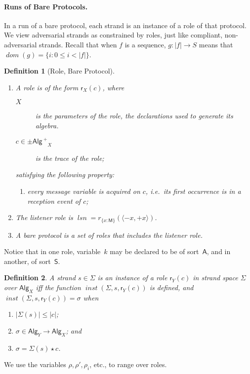 \documentclass[12pt]{article}
\newcommand{\fn}[1]{\ensuremath{\operatorname{\mathit{#1}}}}
\newcommand{\sdom}{\fn{dom}}
\newcommand{\seq}[1]{\ensuremath{\langle#1\rangle}}
\newcommand{\inbnd}{\mathord -}
\newcommand{\outbnd}{\mathord +}
\newcommand{\srt}[1]{\ensuremath{\mathsf{#1}}}
\newcommand{\inst}{\star}
\newcommand{\tr}{\ensuremath{{\pm\msg\,}^+}}
\newcommand{\length}[1]{\ensuremath{|#1|}}
\newcommand{\role}{\mathsf{r}}
\newcommand{\alg}[1]{\ensuremath{\mathsf{#1}}}
\newcommand{\msg}{\alg{Alg}}
\newcommand{\ssp}{\Sigma}
\newcommand{\nonatomic}{{message}}
\newtheorem{definition}{Definition}
\begin{document}
\paragraph{Runs of Bare Protocols.}
%
In a run of a bare protocol, each strand is an instance of a role of
that protocol.  We view adversarial strands as constrained by roles,
just like compliant, non-adversarial strands.  Recall that when $f$ is
a sequence, $g\colon\length{f}\rightarrow S$ means that
$\sdom(g)=\{i\colon0\le i<\length{f}\}$.
%
\begin{definition}[Role, Bare Protocol]\label{def:role bare protocol}
  ~
  \begin{enumerate}
    \item A \emph{role} is of the form $\role_X(c)$, where
    \begin{description}
      \item[$X$] is the \emph{parameters} of the role, the
        declarations used to generate its algebra.
      \item[$c\in\tr_X$] is the trace of the role;
    \end{description}
%
    satisfying the following property:
%
%
    \begin{enumerate}
      \item every {\nonatomic} variable is acquired on $c$, i.e.~its
      first occurrence is in a reception event of $c$;
    \end{enumerate}
    \item The \emph{listener role} is
      $\fn{lsn}=r_{\{x:\srt{M}\}}(\seq{\inbnd x, \outbnd x})$.
    \item A \emph{bare protocol} is a set of roles that includes the
      listener role.
  \end{enumerate}
\end{definition}
%
Notice that in one role, variable~$k$ may be declared to be of
sort~\srt{A}, and in another, of sort~\srt{S}.
%
\begin{definition}\label{def:instance}
  A strand $s\in\ssp$ is an \emph{instance} of a role $\role_Y(c)$ in
  strand space $\ssp$ over $\msg_X$ iff the function
  $\fn{inst}(\ssp,s,\role_Y(c))$ is defined, and
  $\fn{inst}(\ssp,s,\role_Y(c)) = \sigma$ when
  \begin{enumerate}
    \item $\length{\ssp(s)}\leq\length{c}$;
    \item $\sigma\in\msg_Y\to\msg_X$; and
    \item $\sigma = \ssp(s)\inst c$.
  \end{enumerate}
\end{definition}
%
We use the variables $\rho,\rho',\rho_i$, etc., to range over roles.
\end{document}
